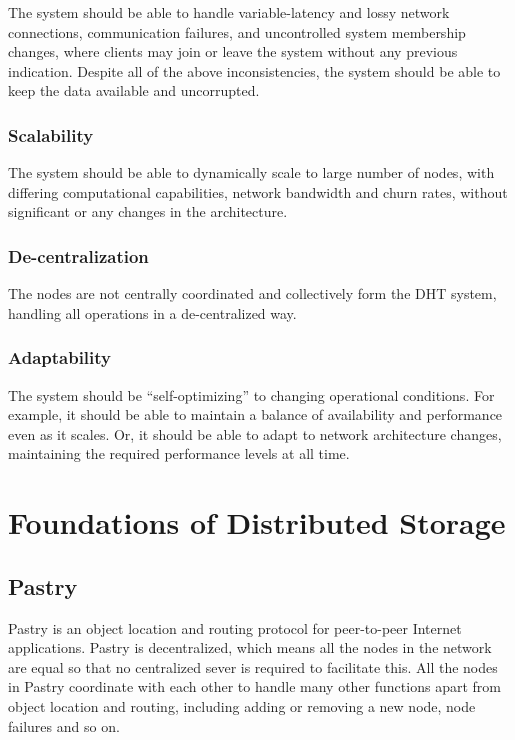 \documentclass[11pt,a4paper]{article}
\begin{document}
    The system should be able to handle variable-latency and lossy network connections, communication failures, and uncontrolled system membership changes, where clients may join or leave the system without any previous indication. Despite all of the above inconsistencies, the system should be able to keep the data available and uncorrupted.
    
    \subsubsection{Scalability}
    
    The system should be able to dynamically scale to large number of nodes, with differing computational capabilities, network bandwidth and churn rates, without significant or any changes in the architecture.
    
    \subsubsection{De-centralization}
    
    The nodes are not centrally coordinated and collectively form the DHT system, handling all operations in a de-centralized way.
    
    \subsubsection{Adaptability}
    
    The system should be ``self-optimizing'' to changing operational conditions. For example, it should be able to maintain a balance of availability and performance even as it scales. Or, it should be able to adapt to network architecture changes, maintaining the required performance levels at all time.
    
    \section{Foundations of Distributed Storage}
    \subsection{Pastry} \label{pastry}
    Pastry \cite{PastryRowstron} is an object location and routing protocol for peer-to-peer Internet applications. Pastry is decentralized, which means all the nodes in the network are equal so that no centralized sever is required to facilitate this. All the nodes in Pastry coordinate with each other to handle many other functions apart from object location and routing, including adding or removing a new node, node failures and so on.
    
\end{document}
